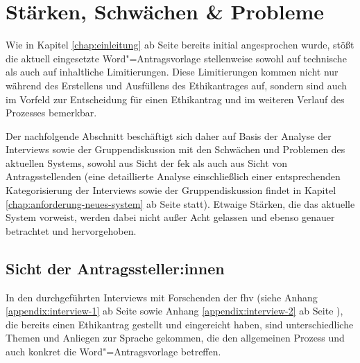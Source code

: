 \documentclass[a4paper,12pt,twoside]{scrreprt}
\begin{document}
\section{Stärken, Schwächen \& Probleme}
\label{sec:stärken-schwächen-probleme}

Wie in Kapitel \ref{chap:einleitung} ab Seite \pageref{chap:einleitung} bereits initial angesprochen wurde, stößt die aktuell eingesetzte Word"=Antragsvorlage stellenweise sowohl auf technische als auch auf inhaltliche Limitierungen. Diese Limitierungen kommen nicht nur während des Erstellens und Ausfüllens des Ethikantrages auf, sondern sind auch im Vorfeld zur Entscheidung für einen Ethikantrag und im weiteren Verlauf des Prozesses bemerkbar.

Der nachfolgende Abschnitt beschäftigt sich daher auf Basis der Analyse der Interviews sowie der Gruppendiskussion mit den Schwächen und Problemen des aktuellen Systems, sowohl aus Sicht der \ac{fek} als auch aus Sicht von Antragsstellenden (eine detaillierte Analyse einschließlich einer entsprechenden Kategorisierung der Interviews sowie der Gruppendiskussion findet in Kapitel \ref{chap:anforderung-neues-system} ab Seite \pageref{chap:anforderung-neues-system} statt). Etwaige Stärken, die das aktuelle System vorweist, werden dabei nicht außer Acht gelassen und ebenso genauer betrachtet und hervorgehoben. 

\subsection{Sicht der Antragssteller:innen}
\label{sub-sec:probleme-sicht-antragssteller}

In den durchgeführten Interviews mit Forschenden der \ac{fhv} (siehe Anhang \ref{appendix:interview-1} ab Seite \pageref{appendix:interview-1} sowie Anhang \ref{appendix:interview-2} ab Seite \pageref{appendix:interview-2}), die bereits einen Ethikantrag gestellt und eingereicht haben, sind unterschiedliche Themen und Anliegen zur Sprache gekommen, die den allgemeinen Prozess und auch konkret die Word"=Antragsvorlage betreffen.
\end{document}
